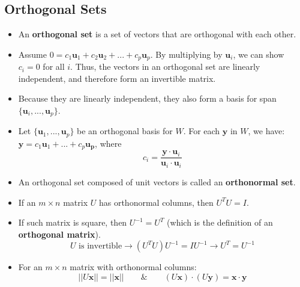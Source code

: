 \documentclass[11pt]{article}
\begin{document}
\subsection{Orthogonal Sets}
\begin{itemize}
\item An \textbf{orthogonal set} is a set of vectors that are orthogonal with each other.
\item Assume $0 = c_1\mathbf{u}_1 + c_2\mathbf{u}_2 + ...  + c_p\mathbf{u}_p$. By multiplying by $\mathbf{u}_i$, we can show $c_i=0$ for all $i$. Thus, the vectors in an orthogonal set are linearly independent, and therefore form an invertible matrix.
\item Because they are linearly independent, they also form a basis for span$\{\mathbf{u}_i,...,\mathbf{u}_p\}$.
\item Let $\{\mathbf{u}_1,...,\mathbf{u}_p\}$ be an orthogonal basis for $W$. For each $\mathbf{y}$ in $W$, we have: $\mathbf{y} = c_1\mathbf{u}_1 + ... + c_p\mathbf{u_p}$, where $$c_i = \frac{\mathbf{y}\cdot\mathbf{u}_i}{\mathbf{u}_i\cdot\mathbf{u}_i}$$ 
\item An orthogonal set composed of unit vectors is called an \textbf{orthonormal set}.
\item If an $m\times n$ matrix $U$ has orthonormal columns, then $U^TU=I$.
\item If such matrix is square, then $U^{-1}=U^T$ (which is the definition of an \textbf{orthogonal matrix}).
$$U\text{ is invertible} \rightarrow (U^TU)U^{-1}=IU^{-1} \rightarrow U^T=U^{-1}$$
\item For an $m\times n$ matrix with orthonormal columns:
$$||U\mathbf{x}|| = ||\mathbf{x}|| \qquad \& \qquad (U\mathbf{x})\cdot(U\mathbf{y})=\mathbf{x}\cdot\mathbf{y}$$
\end{itemize}
\end{document}
